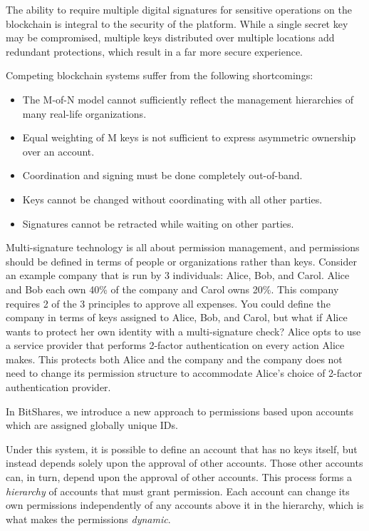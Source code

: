 
The ability to require multiple digital signatures for sensitive operations on
the blockchain is integral to the security of the platform. While a single
secret key may be compromised, multiple keys distributed over multiple
locations add redundant protections, which result in a far more secure
experience.

Competing blockchain systems suffer from the following shortcomings:

\begin{itemize}
 \item The M-of-N model cannot sufficiently reflect the management hierarchies
       of many real-life organizations.
 \item Equal weighting of M keys is not sufficient to express asymmetric
       ownership over an account.
 \item Coordination and signing must be done completely out-of-band.
 \item Keys cannot be changed without coordinating with all other parties.
 \item Signatures cannot be retracted while waiting on other parties.
\end{itemize}

Multi-signature technology is all about permission management, and permissions
should be defined in terms of people or organizations rather than keys.
Consider an example company that is run by 3 individuals: Alice, Bob, and
Carol. Alice and Bob each own 40\% of the company and Carol owns 20\%. This
company requires 2 of the 3 principles to approve all expenses. You could
define the company in terms of keys assigned to Alice, Bob, and Carol, but what
if Alice wants to protect her own identity with a multi-signature check? Alice
opts to use a service provider that performs 2-factor authentication on every
action Alice makes. This protects both Alice and the company and the company
does not need to change its permission structure to accommodate Alice's choice
of 2-factor authentication provider.


In BitShares, we introduce a new approach to permissions based upon accounts
which are assigned globally unique IDs.

Under this system, it is possible to define an account that has no keys itself,
but instead depends solely upon the approval of other accounts. Those other
accounts can, in turn, depend upon the approval of other accounts. This
process forms a \emph{hierarchy} of accounts that must grant permission. Each
account can change its own permissions independently of any accounts above it
in the hierarchy, which is what makes the permissions \emph{dynamic}.


